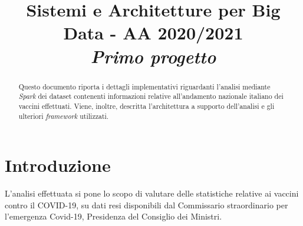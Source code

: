 \documentclass[conference]{IEEEtran}
\begin{document}
\title{Sistemi e Architetture per Big Data - AA 2020/2021 \\
	\LARGE \emph{Primo progetto}}

\author{
\and
{}

}

\maketitle

\begin{abstract}
Questo documento riporta i dettagli implementativi
riguardanti l'analisi mediante \emph{Spark} dei dataset contenenti
informazioni relative all'andamento nazionale italiano dei
vaccini effettuati. Viene, inoltre, descritta l'architettura 
a supporto dell'analisi e gli
ulteriori ​\emph{framework}​ utilizzati.
\end{abstract}

\section{\textbf{Introduzione}}
L'analisi effettuata si pone lo scopo di valutare delle
statistiche relative ai vaccini contro il COVID-19, su dati 
resi disponibili dal Commissario straordinario per l'emergenza Covid-19, 
Presidenza del Consiglio dei Ministri.\\
\end{document}
